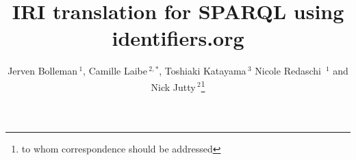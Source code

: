 \documentclass{bioinfo}
\begin{document}

\title[IRI translation for SPARQL using identifiers.org]{IRI translation for SPARQL using identifiers.org}
\author[Jerven Bolleman \textit{et~al}]{Jerven Bolleman\,$^{1}$, Camille Laibe\,$^{2,*}$, Toshiaki Katayama\,$^{3}$ Nicole Redaschi\, $^{1}$ and Nick Jutty\,$^2$\footnote{to whom correspondence should be addressed}}
\address{$^{1}$Swiss-Prot group, SIB Swiss Institute of Bioinformatics, Centre Medical Universitaire, 1211 Geneve, Switzerland \\
$^{2}$European Molecular Biology Laboratory, European Bioinformatics Institute (EMBL-EBI), Wellcome Trust Genome Campus, Hinxton, Cambridge CB10 1SD, UK \\
$^{3}$Database Center for Life Science, Research Organization of Information and Systems, 178-4-4 Wakashiba, Kashiwa, Chiba 277-0871, Japan}



\maketitle
\end{document}
